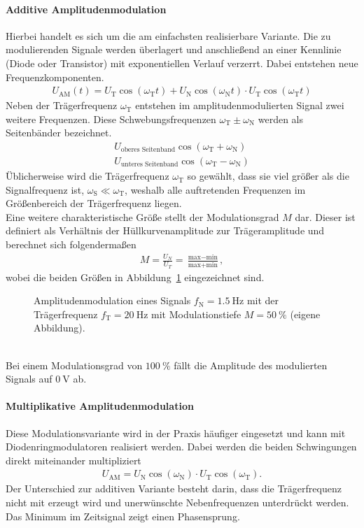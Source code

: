 \documentclass[a4paper,twoside,final]{article}
\begin{document}
\paragraph{Additive Amplitudenmodulation}
Hierbei handelt es sich um die am einfachsten realisierbare Variante. Die zu modulierenden Signale werden überlagert und anschließend an einer Kennlinie (Diode oder Transistor) mit exponentiellen Verlauf verzerrt. Dabei entstehen neue Frequenzkomponenten.
\begin{align}
  U_\text{AM}(t) = U_\text{T}\cos(\omega_\text{T}t) + U_\text{N}\cos(\omega_\text{N}t)\cdot U_\text{T}\cos(\omega_\text{T}t)
\end{align}
Neben der Trägerfrequenz $\omega_\text{T}$ entstehen im amplitudenmodulierten Signal zwei weitere Frequenzen. Diese Schwebungsfrequenzen $\omega_\text{T} \pm \omega_\text{N}$ werden als Seitenbänder bezeichnet.
\begin{align}
  U_\text{oberes Seitenband}\cos(\omega_\text{T} + \omega_\text{N})\\
  U_\text{unteres Seitenband}\cos(\omega_\text{T} - \omega_\text{N})
\end{align}
Üblicherweise wird die Trägerfrequenz $\omega_\text{T}$ so gewählt, dass sie viel größer als die Signalfrequenz ist, $\omega_\text{S} \ll \omega_\text{T}$, weshalb alle auftretenden Frequenzen im Größenbereich der Trägerfrequenz liegen.\\
Eine weitere charakteristische Größe stellt der Modulationsgrad $M$ dar. Dieser ist definiert als Verhältnis der Hüllkurvenamplitude zur Trägeramplitude und berechnet sich folgendermaßen
\begin{align}
  M = \frac{U_N}{U_T} = \frac{\text{max}-\text{min}}{\text{max}+\text{min}},
\end{align}
wobei die beiden Größen in Abbildung~\ref{fig:Amplitudenmodulation} eingezeichnet sind.
\begin{figure}[htp]
    \centering
        
    \caption{Amplitudenmodulation eines Signals $f_\text{N} = \SI{1.5}{\hertz}$ mit der Trägerfrequenz $f_\text{T} = \SI{20}{\hertz}$ mit Modulationstiefe $M = \SI{50}{\percent}$ (eigene Abbildung).}
    \label{fig:Amplitudenmodulation}
\end{figure}\\
Bei einem Modulationsgrad von $\SI{100}{\percent}$ fällt die Amplitude des modulierten Signals auf $\SI{0}{\volt}$ ab.
\paragraph{Multiplikative Amplitudenmodulation}
Diese Modulationsvariante wird in der Praxis häufiger eingesetzt und kann mit Diodenringmodulatoren realisiert werden. Dabei werden die beiden Schwingungen direkt miteinander multipliziert
\begin{align}
    U_\text{AM} = U_\text{N} \cos(\omega_\text{N})\cdot U_\text{T} \cos(\omega_\text{T}).
\end{align}
Der Unterschied zur additiven Variante besteht darin, dass die Trägerfrequenz nicht mit erzeugt wird und unerwünschte Nebenfrequenzen unterdrückt werden. Das Minimum im Zeitsignal zeigt einen Phasensprung.
\end{document}

